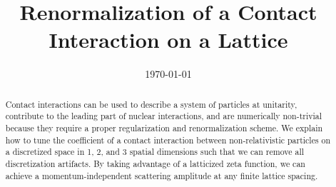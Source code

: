 \documentclass[aps,superscriptaddress,tightenlines,nofootinbib,floatfix,longbibliography,notitlepage,10pt,pra]{revtex4-1}
\begin{document}
\title{Renormalization of a Contact Interaction on a Lattice}


\date{\today}

\begin{abstract}
Contact interactions can be used to describe a system of particles at unitarity, contribute to the leading part of nuclear interactions, and are numerically non-trivial because they require a proper regularization and renormalization scheme.
We explain how to tune the coefficient of a contact interaction between non-relativistic particles on a discretized space in 1, 2, and 3 spatial dimensions such that we can remove all discretization artifacts.
By taking advantage of a latticized \Luscher zeta function, we can achieve a momentum-independent scattering amplitude at any finite lattice spacing.
\end{abstract}

\maketitle









\appendix








\end{document}
